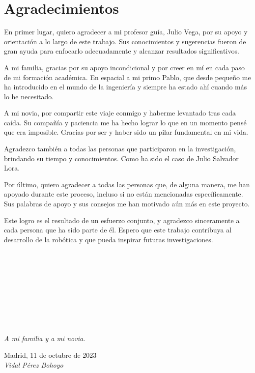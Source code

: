 \cleardoublepage

\chapter*{Agradecimientos}

\noindent En primer lugar, quiero agradecer a mi profesor guía, Julio Vega, por su apoyo y orientación a lo largo de este trabajo. Sus conocimientos y 
sugerencias fueron de gran ayuda para enfocarlo adecuadamente y alcanzar resultados significativos.

A mi familia, gracias por su apoyo incondicional y por creer en mí en cada paso de mi formación académica. En espacial a mi primo Pablo, que desde 
pequeño me ha introducido en el mundo de la ingeniería y siempre ha estado ahí cuando más lo he necesitado.

A mi novia, por compartir este viaje conmigo y haberme levantado tras cada caída. Su compañía y paciencia me ha hecho lograr lo que en un momento pensé 
que era imposible. Gracias por ser y haber sido un pilar fundamental en mi vida.

Agradezco también a todas las personas que participaron en la investigación, brindando su tiempo y conocimientos. Como ha sido el caso de Julio Salvador 
Lora.

Por último, quiero agradecer a todas las personas que, de alguna manera, me han apoyado durante este proceso, incluso si no están mencionadas 
específicamente. Sus palabras de apoyo y sus consejos me han motivado aún más en este proyecto.

Este logro es el resultado de un esfuerzo conjunto, y agradezco sinceramente a cada persona que ha sido parte de él. Espero que este 
trabajo contribuya al desarrollo de la robótica y que pueda inspirar futuras investigaciones.

\ %

\

\

\

\

\begin{flushright}
		\vspace{4.0 cm}
		\emph{A mi familia y a mi novia.}\\
		\par
		\vspace{1.0 cm}
		Madrid, 11 de octubre de 2023\\ %
		\emph{Vidal Pérez Bohoyo}
\end{flushright}

\thispagestyle{empty}

